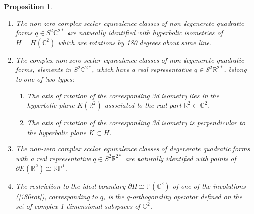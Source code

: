 \documentclass[11pt]{article}
\numberwithin{equation}{section}
\newcounter{count}
\theoremstyle{plain}
\newtheorem{proposition}[count]{Proposition}
\theoremstyle{remark}
\renewcommand{\P}{\mathbb{P}}
\newcommand{\R}{\mathbb{R}}
\newcommand{\C}{\mathbb{C}}
\begin{document}
\begin{proposition}
\text{}
\begin{enumerate}
\itemsep0em 
\item{\label{180rot}
The non-zero complex scalar equivalence classes of non-degenerate quadratic forms $q\in S^{2}\mathbb{C}^{2*}$ are naturally identified with hyperbolic isometries of $H=H(\mathbb{C}^2)$ which are rotations by 180 degrees about some line.}
\item{\label{realforms}
The complex non-zero scalar equivalence classes of non-degenerate quadratic forms, elements in $S^{2}\mathbb{C}^{2*}$, which have a real representative $q\in S^{2}\R^{2*}$, belong to one of two types:
	\begin{enumerate}
	\itemsep0em 
	\item{\label{hyp}The axis of rotation of the corresponding 3d isometry lies in the hyperbolic plane $K(\R^{2})$ associated to the real part $\R^2\subset \mathbb{C}^{2}$.}
	\item{\label{ell}The axis of rotation of the corresponding 3d isometry is perpendicular to the hyperbolic plane $K\subset H$.}
	\end{enumerate}
}
\item{\label{par}The non-zero complex scalar equivalence classes of degenerate quadratic forms with a real representative $q\in S^{2}\R^{2*}$ are naturally identified with points of $\partial K(\mathbb{R}^{2})\cong \mathbb{RP}^{1}$.}
\item{\label{orth}The restriction to the ideal boundary $\partial H\cong \P(\C^2)$ of one of the involutions (\ref{180rot}), corresponding to $q$, is the $q$-orthogonality operator defined on the set of complex 1-dimensional subspaces of $\C^{2}$.}
\end{enumerate}
\end{proposition}
\end{document}

